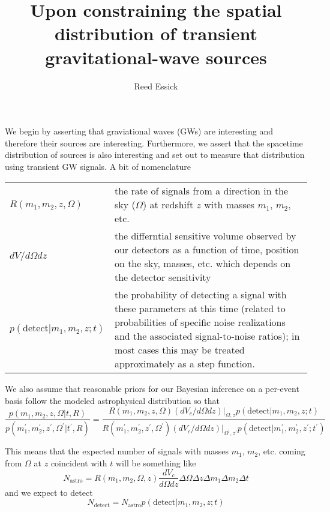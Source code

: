 \documentclass{article}
\begin{document}
\title{
Upon constraining the spatial distribution of transient gravitational-wave sources
}

\author{
Reed Essick
}

\maketitle


\doublespace

We begin by asserting that graviational waves (GWs) are interesting and therefore their sources are interesting.
Furthermore, we assert that the spacetime distribution of sources is also interesting and set out to measure that distribution using transient GW signals.
A bit of nomenclature

\vspace{0.5cm}
\begin{tabular}{p{3cm}p{12cm}}
    $R(m_1, m_2, z, \Omega)$ & the rate of signals from a direction in the sky ($\Omega$) at redshift $z$ with masses $m_1$, $m_2$, etc. \\
    $dV/d\Omega dz$     & the differntial sensitive volume observed by our detectors as a function of time, position on the sky, masses, etc. which depends on the detector sensitivity \\
    $p(\mathrm{detect}|m_1,m_2,z;t)$ & the probability of detecting a signal with these parameters at this time (related to probabilities of specific noise realizations and the associated signal-to-noise ratios); in most cases this may be treated approximately as a step function.
\end{tabular}

\vspace{0.5cm}
We also assume that reasonable priors for our Bayesian inference on a per-event basis follow the modeled astrophysical distribution so that
\begin{equation}
    \frac{p(m_1, m_2, z, \Omega|t,R)}{p(m_1^\prime, m_2^\prime, z^\prime, \Omega^\prime|t^\prime,R)} = \frac{R(m_1, m_2, z, \Omega) \left.(dV_c/d\Omega dz)\right|_{\Omega, z} p(\mathrm{detect}|m_1, m_2, z; t)}{R(m_1^\prime, m_2^\prime, z^\prime, \Omega^\prime) \left.(dV_c/d\Omega dz)\right|_{\Omega^\prime, z^\prime} p(\mathrm{detect}|m_1^\prime, m_2^\prime, z^\prime; t^\prime)}
\end{equation}

This means that the expected number of signals with masses $m_1$, $m_2$, etc. coming from $\Omega$ at $z$ coincident with $t$ will be something like 
\begin{equation}
    N_\mathrm{astro} = R(m_1, m_2, \Omega, z) \frac{dV_c}{d\Omega dz} \Delta\Omega \Delta z \Delta m_1 \Delta m_2 \Delta t
\end{equation}
and we expect to detect 
\begin{equation}
    N_\mathrm{detect} = N_\mathrm{astro} p(\mathrm{detect}|m_1, m_2, z;t)
\end{equation}
\end{document}
